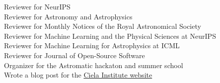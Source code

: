 Reviewer for NeurIPS \hfill {}\\
Reviewer for Astronomy and Astrophysics \hfill {}\\
Reviewer for Monthly Notices of the Royal Astronomical Society \hfill {}\\
Reviewer for Machine Learning and the Physical Sciences at NeurIPS \hfill {}\\
Reviewer for Machine Learning for Astrophysics at ICML \hfill {}\\
Reviewer for Journal of Open-Source Software \hfill {} \\
Organizer for the Astromatic hackaton and summer school \hfill {}\\
Wrote a blog post for the \href{https://ciela.science/2024/03/15/echoes-in-the-noise/}{Ciela Institute website} \hfill {}
